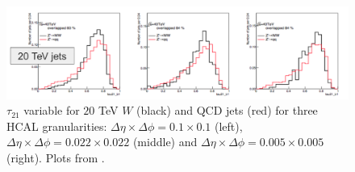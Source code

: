 \begin{figure}
	\centering
	\includegraphics[width=\textwidth]{./Figures/overlap.png}
	\caption{$\tau_{21}$ variable for $20$ TeV $W$ (black) and QCD jets (red) for three HCAL granularities: $\Delta\eta\times\Delta\phi=0.1\times 0.1$ (left), $\Delta\eta\times\Delta\phi=0.022\times 0.022$ (middle) and $\Delta\eta\times\Delta\phi=0.005\times 0.005$ (right). Plots from \cite{BOOST2017}.}
	\label{fig:overlap}
\end{figure}

%
%

